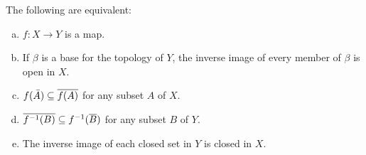 \begin{theorem}
    The following are equivalent:
    \begin{enumerate}[(a)]
        \item $f\colon X\to Y$ is a map.
        \item If $\beta$ is a base for the topology of $Y$, the inverse image of every member of $\beta$ is open in $X$.
        \item $f(\bar{A}) \subseteq \overline{f(A)}$ for any subset $A$ of $X$.
        \item $\overline{f^{-1}(B)} \subseteq f^{-1}(\overline{B})$ for any subset $B$ of $Y$.
        \item The inverse image of each closed set in $Y$ is closed in $X$.
    \end{enumerate}
\end{theorem}
